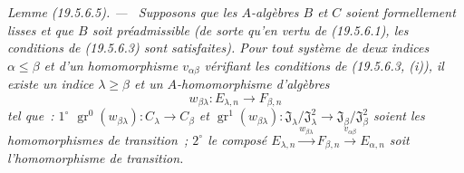 \documentclass[10pt,oneside]{book}
\makeatletter
\newcommand{\gr}{\operatorname{gr}}
\newcommand{\setmanualcurrentlabel}[1]{\def\@currentlabel{#1}}
\newenvironment{lemma}[1][]{%
  \setmanualcurrentlabel{#1}\par\medskip\noindent\itshape Lemme (#1). ---\ }{\par}
\makeatother
\begin{document}
\begin{lemma}[19.5.6.5]
\label{0.19.5.6.5-fr}
Supposons que les $A$-algèbres $B$ et $C$ soient formellement lisses et que
$B$ soit préadmissible (de sorte qu'en vertu de (19.5.6.1), les conditions de
(19.5.6.3) sont satisfaites). Pour tout système de deux indices
$\alpha\leq\beta$ et d'un homomorphisme $v_{\alpha\beta}$ vérifiant les
conditions de (19.5.6.3, (i)), il existe un indice $\lambda\geq\beta$ et un
$A$-homomorphisme d'algèbres
\[
  w_{\beta\lambda}:E_{\lambda,n}\longrightarrow F_{\beta,n}
\]
tel que~: $1^\circ$ $\gr^0(w_{\beta\lambda}):C_\lambda\to C_\beta$ et
$\gr^1(w_{\beta\lambda}):
\mathfrak J_\lambda/\mathfrak J_\lambda^2\to
\mathfrak J_\beta/\mathfrak J_\beta^2$ soient les homomorphismes de
transition~; $2^\circ$ le composé
$E_{\lambda,n}\xrightarrow{w_{\beta\lambda}}F_{\beta,n}
\xrightarrow{v_{\alpha\beta}}E_{\alpha,n}$ soit l'homomorphisme de transition.
\end{lemma}
\end{document}
